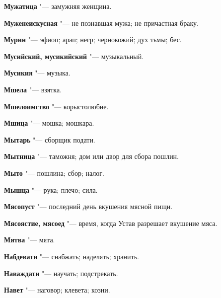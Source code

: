 \begin{mymulticols}{2}
\noindent\textbf{Мужатица} "--- замужняя женщина. 




\noindent\textbf{Муженеискусная} "--- не познавшая мужа; не причастная браку. 




\noindent\textbf{Мурин} "--- эфиоп; арап; негр; чернокожий; дух тьмы; бес. 




\noindent\textbf{Мусийский, мусикийский} "--- музыкальный. 




\noindent\textbf{Мусикия} "--- музыка. 




\noindent\textbf{Мшела} "--- взятка. 




\noindent\textbf{Мшелоимство} "--- корыстолюбие. 




\noindent\textbf{Мшица} "--- мошка; мошкара. 




\noindent\textbf{Мытарь} "--- сборщик подати. 




\noindent\textbf{Мытница} "--- таможня; дом или двор для сбора пошлин. 




\noindent\textbf{Мыто} "--- пошлина; сбор; налог. 




\noindent\textbf{Мышца} "--- рука; плечо; сила. 




\noindent\textbf{Мясопуст} "--- последний день вкушения мясной пищи. 




\noindent\textbf{Мясоястие, мясоед} "--- время, когда Устав разрешает вкушение мяса. 




\noindent\textbf{Мятва} "--- мята. 









\noindent\textbf{Набдевати} "--- снабжать; наделять; хранить. 




\noindent\textbf{Наваждати} "--- научать; подстрекать. 




\noindent\textbf{Навет} "--- наговор; клевета; козни. 





\end{mymulticols}
